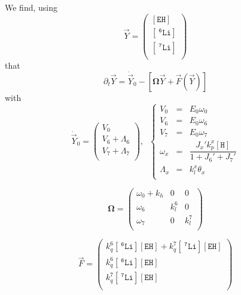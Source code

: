 \documentclass[aps,onecolumn,11pt]{revtex4}
\newcommand{\mychem}[1]{\mathtt{#1}}
\newcommand{\myconc}[1]{\left\lbrack{#1}\right\rbrack}
\newcommand{\spLi}[1]{{~^{\mychem{#1}}\mychem{Li}}}
\newcommand{\Li}[1]{\myconc{\spLi{#1}}}
\newcommand{\spEHin}{\mychem{EH}}
\newcommand{\EHin}{\myconc{\spEHin}}
\newcommand{\spproton}{\mychem{H}}
\newcommand{\proton}{\myconc{\spproton}}
\newcommand{\mymat}[1]{{\bm{#1}}}
\begin{document}
We find, using
\begin{equation}
	\vec{Y} = \begin{pmatrix}
	\EHin\\
	\Li{6}\\
	\Li{7}\\
	\end{pmatrix}
\end{equation}
that
\begin{equation}
	\partial_t \vec{Y} = \dot{\vec{Y}}_0 - \left\lbrack \mymat{\Omega}\vec{Y} + \vec{F}\left(\vec{Y}\right)\right\rbrack
\end{equation}
with
\begin{equation}
	\dot{\vec{Y}}_0 = 
	\begin{pmatrix}
	V_0\\
	V_6+\Lambda_6\\
	V_7+\Lambda_7\\
	\end{pmatrix},
	\;\;
	\left\lbrace
	\begin{array}{rcl}
	V_0 & = &E_0 \omega_0\\
	V_6 & = &E_0 \omega_6\\
	V_7 & = &E_0 \omega_7\\
	\omega_x & = & \dfrac{J_x' k_p^x \proton}{1+J_6'+J_7'}\\
	\Lambda_x & = & k_l^x \theta_x \\
	\end{array}
	\right.
\end{equation}

\begin{equation}
	\mymat{\Omega} = 
	\begin{pmatrix}
	\omega_0 + k_h & 0 & 0 \\
	\omega_6 & k_l^6 & 0 \\
	\omega_7 & 0 & k_l^7 \\
	\end{pmatrix}
\end{equation}

\begin{equation}
	\vec{F} = 
	\begin{pmatrix}
	k_q^6 \Li{6} \EHin + k_q^7 \Li{7} \EHin \\
	k_q^6 \Li{6} \EHin\\
	k_q^7 \Li{7} \EHin\\
	\end{pmatrix}
\end{equation}
\end{document}
